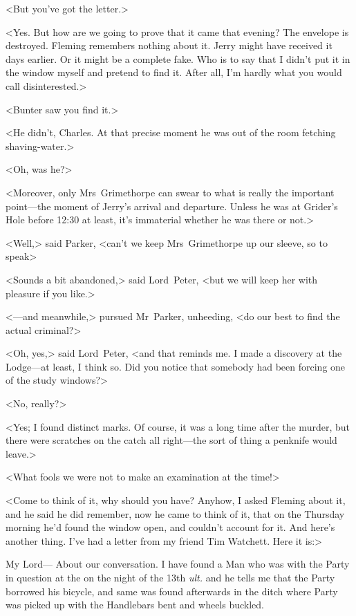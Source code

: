 <But you've got the letter.>

<Yes. But how are we going to prove that it came that evening? The envelope is destroyed. Fleming remembers nothing about it. Jerry might have received it days earlier. Or it might be a complete fake. Who is to say that I didn't put it in the window myself and pretend to find it. After all, I'm hardly what you would call disinterested.>

<Bunter saw you find it.>

<He didn't, Charles. At that precise moment he was out of the room fetching shaving-water.>

<Oh, was he?>

<Moreover, only Mrs~Grimethorpe can swear to what is really the important point—the moment of Jerry's arrival and departure. Unless he was at Grider's Hole before 12:30 at least, it's immaterial whether he was there or not.>

<Well,> said Parker, <can't we keep Mrs~Grimethorpe up our sleeve, so to speak\longdash>

<Sounds a bit abandoned,> said Lord~Peter, <but we will keep her with pleasure if you like.>

<—and meanwhile,> pursued Mr~Parker, unheeding, <do our best to find the actual criminal?>

<Oh, yes,> said Lord~Peter, <and that reminds me. I made a discovery at the Lodge—at least, I think so. Did you notice that somebody had been forcing one of the study windows?>

<No, really?>

<Yes; I found distinct marks. Of course, it was a long time after the murder, but there were scratches on the catch all right—the sort of thing a penknife would leave.>

<What fools we were not to make an examination at the time!>

<Come to think of it, why should you have? Anyhow, I asked Fleming about it, and he said he did remember, now he came to think of it, that on the Thursday morning he'd found the window open, and couldn't account for it. And here's another thing. I've had a letter from my friend Tim Watchett. Here it is:>


\begin{mail}{}{My Lord---}
	About our conversation. I have found a Man who was with the Party in question at the  on the night of the 13th \textit{ult.} and he tells me that the Party borrowed his bicycle, and same was found afterwards in the ditch where Party was picked up with the Handlebars bent and wheels buckled.
\end{mail}

